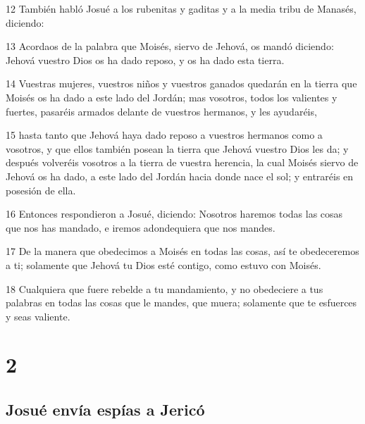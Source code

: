 \par 12 También habló Josué a los rubenitas y gaditas y a la media tribu de Manasés, diciendo:
\par 13 Acordaos de la palabra que Moisés, siervo de Jehová, os mandó diciendo: Jehová vuestro Dios os ha dado reposo, y os ha dado esta tierra.
\par 14 Vuestras mujeres, vuestros niños y vuestros ganados quedarán en la tierra que Moisés os ha dado a este lado del Jordán; mas vosotros, todos los valientes y fuertes, pasaréis armados delante de vuestros hermanos, y les ayudaréis,
\par 15 hasta tanto que Jehová haya dado reposo a vuestros hermanos como a vosotros, y que ellos también posean la tierra que Jehová vuestro Dios les da; y después volveréis vosotros a la tierra de vuestra herencia, la cual Moisés siervo de Jehová os ha dado, a este lado del Jordán hacia donde nace el sol; y entraréis en posesión de ella. 
\par 16 Entonces respondieron a Josué, diciendo: Nosotros haremos todas las cosas que nos has mandado, e iremos adondequiera que nos mandes.
\par 17 De la manera que obedecimos a Moisés en todas las cosas, así te obedeceremos a ti; solamente que Jehová tu Dios esté contigo, como estuvo con Moisés.
\par 18 Cualquiera que fuere rebelde a tu mandamiento, y no obedeciere a tus palabras en todas las cosas que le mandes, que muera; solamente que te esfuerces y seas valiente.

\chapter{2}

\section*{Josué envía espías a Jericó}

